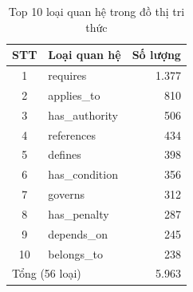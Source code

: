\begin{table}[htbp]
  \centering
  \caption{Top 10 loại quan hệ trong đồ thị tri thức}
  \label{tab:top-rel-types}
  \begin{tabular}{clr}
    \toprule
    \textbf{STT} & \textbf{Loại quan hệ} & \textbf{Số lượng} \\
    \midrule
    1  & requires       & 1.377 \\
    2  & applies\_to    &   810 \\
    3  & has\_authority &   506 \\
    4  & references     &   434 \\
    5  & defines        &   398 \\
    6  & has\_condition &   356 \\
    7  & governs        &   312 \\
    8  & has\_penalty   &   287 \\
    9  & depends\_on    &   245 \\
    10 & belongs\_to    &   238 \\
    \midrule
    \multicolumn{2}{l}{Tổng (56 loại)} & 5.963 \\
    \bottomrule
  \end{tabular}
\end{table}
